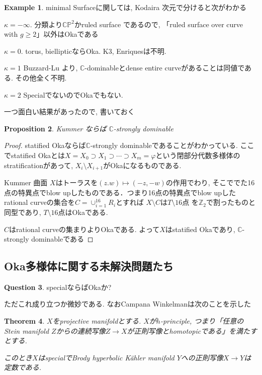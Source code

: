 \documentclass[dvipdfmx,a4paper,11pt]{article} %
\newtheorem{thm}{Theorem}[section]
\newtheorem{prop}[thm]{Proposition}
\theoremstyle{definition}
\newtheorem{ex}[thm]{Example}
\newtheorem{ques}[thm]{Question}
\theoremstyle{remark}
\numberwithin{equation}{section}
\newcommand{\Z}{\mathbb{Z}}
\newcommand{\C}{\mathbb{C}}
\begin{document}
\begin{ex}\cite[Subsection 2.8]{For13}
minimal Surfaceに関しては, Kodaira 次元で分けると次がわかる

$\kappa=- \infty$. 分類より$\C\mathbb{P}^2$かruled surface
であるので, 「ruled surface over curve with $g\ge 2$」以外はOkaである

$\kappa=0$.
torus, biellipticならOka. 
K3, Enriquesは不明.

$\kappa=1$ 
Buzzard-Lu \cite{BL00}より, $\C$-dominableとdense entire curveがあることは同値である.
その他全く不明. 

$\kappa =2$
SpecialでないのでOkaでもない.
\end{ex}

一つ面白い結果があったので, 書いておく
\begin{prop}\cite[Cor 2.39]{For13}
Kummer ならば $\C$-strongly dominable
\end{prop}
\begin{proof}
statified Okaならば$\C$-strongly dominableであることがわかっている.
ここでstatified Okaとは$X=X_0 \supset X_1\supset \cdots \supset X_m = \varphi$という閉部分代数多様体のstratificationがあって, $X_i \setminus X_{i+1}$がOkaになるものである.

Kummer 曲面 $X$はトーラスを$(z.w) \mapsto (-z,-w)$の作用でわり, そこででた16点の特異点でblow upしたものである．つまり16点の特異点でblow upしたrational curveの集合を$C=\cup_{i=1}^{16}R_i$とすれば
$X \setminus C $は$ T \setminus{\text{16点}}$ を$\Z_2$で割ったものと同型であり, $T \setminus{\text{16点}}$はOkaである.

$C$はrational curveの集まりよりOkaである. よって$X$はstatified Okaであり, $\C$-strongly dominableである
\end{proof}

\subsection{Oka多様体に関する未解決問題たち}

\begin{ques}
specialならばOkaか?
\end{ques}
ただこれ成り立つか微妙である. 
なおCampana Winkelmanは次のことを示した
\begin{thm}\cite{CW15}
$X$をprojective manifoldとする.
$X$が$h$-principle, つまり「任意のStein manifold $Z$からの連続写像$Z \to X$が正則写像とhomotopicである」を満たすとする.

このとき$X$はspecialでBrody hyperbolic K\"ahler manifold $Y$への正則写像$X \to Y$は定数である.
\end{thm}
\end{document}
